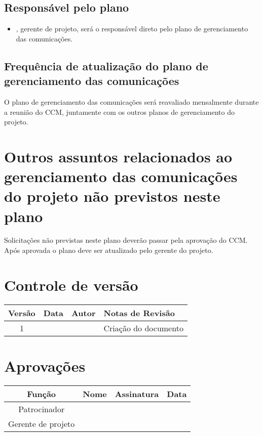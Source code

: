 \subsection{Responsável pelo plano}

\begin{itemize}
	\item \projectManagerName{}, gerente de projeto, será o responsável direto pelo plano de gerenciamento das comunicações.
\end{itemize}

\subsection{Frequência de atualização do plano de gerenciamento das comunicações}

O plano de gerenciamento das comunicações será reavaliado mensalmente durante a reunião do CCM, juntamente com os outros planos de gerenciamento do projeto.

\section{Outros assuntos relacionados ao gerenciamento das comunicações do projeto não previstos neste plano}

Solicitações não previstas neste plano deverão passar pela aprovação do CCM. Após aprovada o plano deve ser atualizado pelo gerente do projeto.

\section{Controle de versão}

\begin{table}[H]
	\begin{tabularx}{\textwidth}{| c | c | X | X |}
		\hline
		\textbf{Versão} & \textbf{Data} & \textbf{Autor}        & \textbf{Notas de Revisão} \\
		\hline
		1                &               & \projectManagerName{} & Criação do documento     \\
		\hline
	\end{tabularx}
	\centering
\end{table}

\section{Aprovações}

\begin{table}[H]
	\begin{tabularx}{\textwidth}{| c | c | X | c |}
		\hline
		\textbf{Função}  & \textbf{Nome}         & \textbf{Assinatura}        & \textbf{Data} \\
		\hline
		Patrocinador       & \projectSponsorName{} & \projectSponsorSignature{} &               \\
		\hline
		Gerente de projeto & \projectManagerName{} & \projectManagerSignature{} &               \\
		\hline
	\end{tabularx}
	\centering
\end{table}
